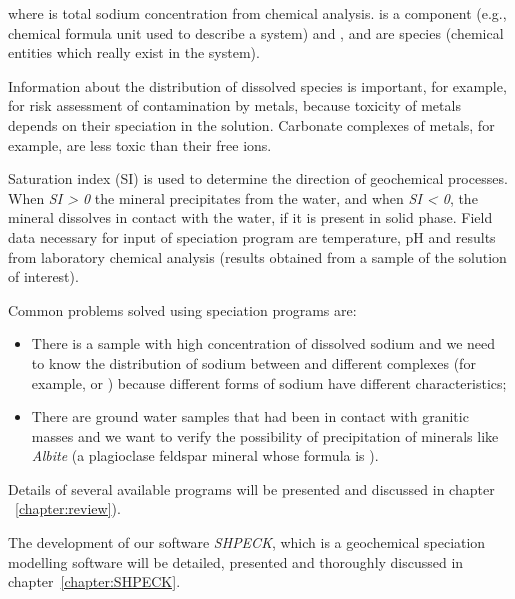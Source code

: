 \documentclass[ppgc,mestrado,English]{iiufrgs}
\begin{document}
where  is total sodium concentration from chemical analysis.  is a component (e.g., chemical formula unit used to describe a system) and ,  and  are species (chemical entities which really exist in the system). 

Information about the distribution of dissolved species is important, for example, for risk assessment of contamination by metals, because toxicity of metals depends on their speciation in the solution. Carbonate complexes of metals, for example, are less toxic than their free ions.

Saturation index (SI) is used to determine the direction of geochemical processes. When \emph{SI > 0} the mineral precipitates from the water, and when \emph{SI < 0}, the mineral dissolves in contact with the water, if it is present in solid phase. Field data necessary for input of speciation program are temperature, pH and results from laboratory chemical analysis (results obtained from a sample of the solution of interest).

Common problems solved using speciation programs are: 
\begin{itemize}
\item There is a sample with high concentration of dissolved sodium and we need to know the distribution of sodium between  and different complexes (for example,  or ) because different forms of sodium have different characteristics;
\item There are ground water samples that had been in contact with granitic masses and we want to verify the possibility of precipitation of minerals like \emph{Albite} (a plagioclase feldspar mineral whose formula is \emph{}).
\end{itemize}

Details of several available programs will be presented and discussed in chapter ~\ref{chapter:review}).

The development of our software \emph{SHPECK}, which is a geochemical speciation modelling software will be detailed, presented and thoroughly discussed in chapter~\ref{chapter:SHPECK}. 


\end{document}
